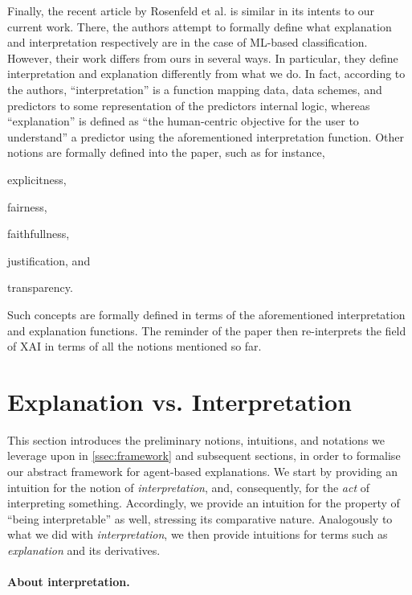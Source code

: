 \documentclass[12pt,a4paper,openright,twoside]{book}
\begin{document}
Finally, the recent article by Rosenfeld et al. \cite{RosenfeldR2019} is similar in its intents to our current work.
%
There, the authors attempt to formally define what explanation and interpretation respectively are in the case of ML-based classification. 
%
However, their work differs from ours in several ways.
%
In particular, they define interpretation and explanation differently from what we do.
%
In fact, according to the authors, ``interpretation'' is a function mapping data, data schemes, and predictors to some representation of the predictors internal logic, whereas ``explanation'' is defined as ``the human-centric objective for the user to understand'' a predictor using the aforementioned interpretation function.
%
Other notions are formally defined into the paper, such as for instance, 
%
\begin{inlinelist}
    \item explicitness, 
	\item fairness, 
	\item faithfullness,
	\item justification, and
	\item transparency.
\end{inlinelist}
%
Such concepts are formally defined in terms of the aforementioned interpretation and explanation functions.
%
The reminder of the paper then re-interprets the field of XAI in terms of all the notions mentioned so far. 

\section{Explanation vs. Interpretation}\label{sec:basics}

This section introduces the preliminary notions, intuitions, and notations we leverage upon in \cref{ssec:framework} and subsequent sections, in order to formalise our abstract framework for agent-based explanations.
%
We start by providing an intuition for the notion of \emph{interpretation}, and, consequently, for the \emph{act} of interpreting something.
%
Accordingly, we provide an intuition for the property of ``being interpretable'' as well, stressing its comparative nature.
%
Analogously to what we did with \emph{interpretation}, we then provide intuitions for terms such as \emph{explanation} and its derivatives.

\paragraph{About interpretation.}
\end{document}
